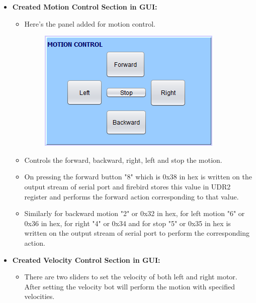 \documentclass{article}
\begin{document}
\begin{enumerate}
\begin{itemize}
\begin{itemize}
			\end{itemize}   
			\item \textbf{Created Motion Control Section in GUI:}
			\begin{itemize}
				\item Here's the panel added for motion control.\\
				\begin{figure}[h]
					\begin{center}
						\includegraphics[scale=1]{motioncontrol.png}
					\end{center}
				\end{figure}
				\item  Controls the forward, backward, right, left and stop the motion.
				\item On pressing the forward button "8" which is 0x38 in hex is written on the output stream of serial port and firebird stores this value in UDR2 register and performs the forward action corresponding to that value. 
				\item Similarly for backward motion "2" or 0x32 in hex, for left motion "6" or 0x36 in hex, for right "4" or 0x34 and for stop "5" or 0x35 in hex is written on the output stream of serial port to perform the corresponding action.
			\end{itemize}  
			\newpage    
			\item \textbf{Created Velocity Control Section in GUI:}
			\begin{itemize}
				\item There are two sliders to set the velocity of both left and right motor. After setting the velocity bot will perform the motion with specified velocities.\\
				\begin{figure}[h]
					\begin{center}

\end{center}
\end{figure}
\end{itemize}
\end{itemize}
\end{enumerate}
\end{document}
